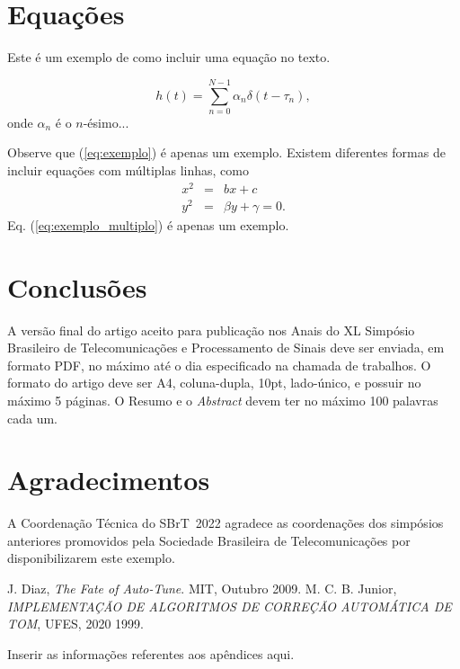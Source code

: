 \documentclass{sbrt}
\begin{document}
\section{Equações}

Este é um exemplo de como incluir uma equação no texto.

\begin{equation}\label{eq:exemplo}
    h(t)=\sum_{n=0}^{N-1} \alpha_n\delta(t-\tau_n),
\end{equation}
onde $\alpha_n$ é o $n$-ésimo...

Observe que (\ref{eq:exemplo}) é apenas um exemplo. Existem diferentes formas de incluir equações com múltiplas linhas, como
\begin{equation} \label{eq:exemplo_multiplo}
    \begin{array}{ccl}
        x^2 & = & bx+c\\
        y^2 & = &\beta y+\gamma=0.
    \end{array}
\end{equation}
Eq. (\ref{eq:exemplo_multiplo}) é apenas um exemplo.

\section{Conclusões}
A versão final do artigo aceito para publicação nos Anais do XL Simpósio Brasileiro de Telecomunicações e Processamento de Sinais deve ser enviada, em formato PDF, no máximo até o dia especificado na chamada de trabalhos. O formato do artigo deve ser A4, coluna-dupla, 10pt, lado-único, e possuir no máximo 5 páginas. O Resumo e o \emph{Abstract} devem ter no máximo 100 palavras cada um.

\section*{Agradecimentos}
A Coordenação Técnica do SBrT~2022 agradece as coordenações dos simpósios anteriores promovidos pela Sociedade Brasileira de Telecomunicações por disponibilizarem este exemplo.

\begin{thebibliography}{99}
 J. Diaz, \textit{The Fate of Auto-Tune}. MIT, Outubro 2009.
 M. C. B. Junior, \textit{IMPLEMENTAÇÃO DE ALGORITMOS DE CORREÇÃO
AUTOMÁTICA DE TOM}, UFES, 2020
1999.
\end{thebibliography}


\appendix
Inserir as informações referentes aos apêndices aqui.
\end{document}
